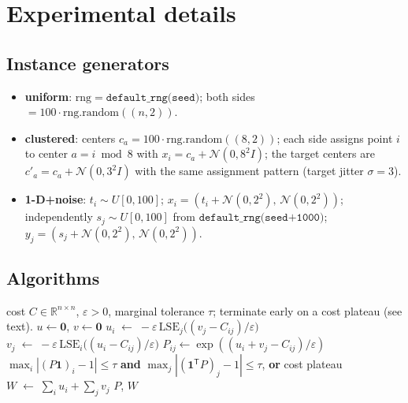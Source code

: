 \documentclass[11pt]{article}
\theoremstyle{remark}
\begin{document}
\section{Experimental details}
\label{app:detail}

\subsection{Instance generators}
\begin{itemize}[leftmargin=2em,itemsep=1pt]
\item \textbf{uniform}: $\mathrm{rng}=\texttt{default\_rng(seed)}$; both
  sides $=100\cdot \mathrm{rng.random}((n,2))$.
\item \textbf{clustered}: centers $c_a=100\cdot\mathrm{rng.random}((8,2))$;
  each side assigns point $i$ to center $a=i\bmod 8$ with
  $x_i=c_{a}+\mathcal N(0,8^2 I)$; the target centers are
  $c'_a=c_a+\mathcal N(0,3^2 I)$ with the same assignment pattern (target
  jitter $\sigma=3$).
\item \textbf{1-D+noise}: $t_i\sim U[0,100]$;
  $x_i=(t_i+\mathcal N(0,2^2),\,\mathcal N(0,2^2))$; independently
  $s_j\sim U[0,100]$ from $\texttt{default\_rng(seed+1000)}$;
  $y_j=(s_j+\mathcal N(0,2^2),\,\mathcal N(0,2^2))$.
\end{itemize}

\subsection{Algorithms}
\begin{algorithm}[h]
\caption{Log-domain Sinkhorn (vanilla), after~\cite{sinkknopp1967,cuturi2013}}\label{alg:sink}
\begin{algorithmic}[1]
\Require cost $C\in \mathbb R^{n\times n}$, $\varepsilon>0$, marginal
  tolerance $\tau$; terminate early on a cost plateau (see text).
\State $u\leftarrow \mathbf{0}$, $v\leftarrow \mathbf{0}$
\Repeat
    \State $u_i\;\leftarrow\; -\varepsilon\,\mathrm{LSE}_j\bigl((v_j-C_{ij})/\varepsilon\bigr)$
  \EndFor
    \State $v_j\;\leftarrow\; -\varepsilon\,\mathrm{LSE}_i\bigl((u_i-C_{ij})/\varepsilon\bigr)$
  \EndFor
  \State $P_{ij}\leftarrow \exp((u_i+v_j-C_{ij})/\varepsilon)$
\Until $\max_i|(P\mathbf 1)_i-1|\le\tau$ \textbf{and}
       $\max_j|(\mathbf 1^{\mathsf T}P)_j-1|\le\tau$, \textbf{or} cost plateau
\State $W \;\leftarrow\; \sum_i u_i+\sum_j v_j$
\State \Return $P$, $W$
\end{algorithmic}
\end{algorithm}
\end{document}
